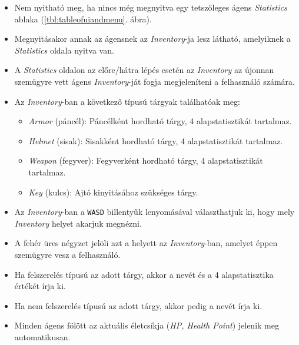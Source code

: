 
\begin{itemize}
    \item Nem nyitható meg, ha nincs még megnyitva egy tetszőleges ágens \textit{Statistics} ablaka (\ref{tbl:tableofuiandmenu}. ábra).
    \item Megnyitásakor annak az ágensnek az \textit{Inventory}-ja lesz látható, amelyiknek a \textit{Statistics} oldala nyitva van.
    \item A \textit{Statistics} oldalon az előre/hátra lépés esetén az \textit{Inventory} az újonnan szemügyre vett ágens \textit{Inventory}-ját fogja megjeleníteni a felhasználó számára.
    \item Az \textit{Inventory}-ban a következő típusú tárgyak találhatóak meg:
    \begin{itemize}
    \item \textit{Armor} (páncél): Páncélként hordható tárgy, 4 alapstatisztikát tartalmaz.
    \item \textit{Helmet} (sisak): Sisakként hordható tárgy, 4 alapstatisztikát tartalmaz.
    \item \textit{Weapon} (fegyver): Fegyverként hordható tárgy, 4 alapstatisztikát tartalmaz.
    \item \textit{Key} (kulcs): Ajtó kinyitásához szükséges tárgy.
    \end{itemize}
    \item Az \textit{Inventory}-ban a \texttt{WASD} billentyűk lenyomásával választhatjuk ki, hogy mely \textit{Inventory} helyet akarjuk megnézni.
    \item A fehér üres négyzet jelöli azt a helyett az \textit{Inventory}-ban, amelyet éppen szemügyre vesz a felhasználó.
    \item Ha felszerelés típusú az adott tárgy, akkor a nevét és a 4 alapstatisztika értékét írja ki.
    \item Ha nem felszerelés típusú az adott tárgy, akkor pedig a nevét írja ki.
\end{itemize}


\begin{itemize}
    \item Minden ágens fölött az aktuális életcsíkja (\textit{HP, Health Point}) jelenik meg automatikusan.
\end{itemize}

\newpage


